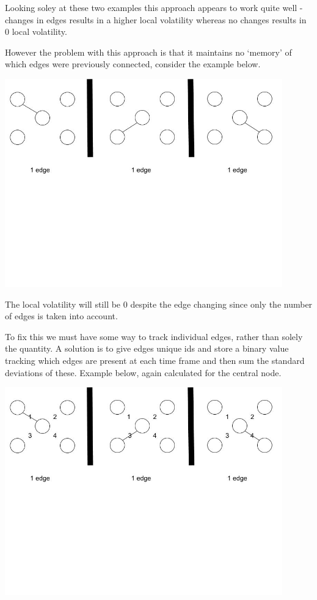 Looking soley at these two examples this approach appears to work quite well - changes in edges results in a higher local volatility whereas no changes results in 0 local volatility.

However the problem with this approach is that it maintains no ‘memory’ of which edges were previously connected, consider the example below.
\begin{center}
\includegraphics[trim={0 10cm 0 -1cm}, width=120mm]{./Figures/volatility3.jpg}
\end{center}

The local volatility will still be 0 despite the edge changing since only the number of edges is taken into account.

To fix this we must have some way to track individual edges, rather than solely the quantity. A solution is to give edges unique ids and store a binary value tracking which edges are present at each time frame and then sum the standard deviations of these. Example below, again calculated for the central node.

\begin{center}
\includegraphics[trim={0 10cm 0 -1cm}, width=120mm]{./Figures/volatility4.jpg}
\end{center}

